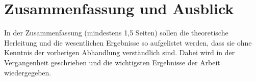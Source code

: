 \chapter{Zusammenfassung und Ausblick}

In der Zusammenfassung (mindestens 1,5 Seiten) sollen die theoretische Herleitung
und die wesentlichen Ergebnisse so aufgelistet werden, dass sie ohne Kenntnis der
vorherigen Abhandlung verständlich sind. Dabei wird in der Vergangenheit geschrieben und die wichtigsten Ergebnisse
der Arbeit wiedergegeben.